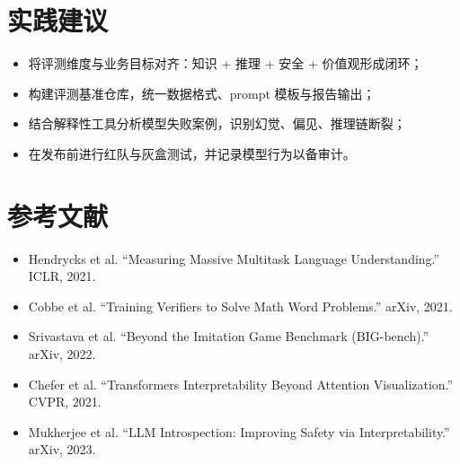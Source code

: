 \documentclass[UTF8,zihao=-4]{ctexart}
\begin{document}
\section*{实践建议}
\begin{itemize}
  \item 将评测维度与业务目标对齐：知识 + 推理 + 安全 + 价值观形成闭环；
  \item 构建评测基准仓库，统一数据格式、prompt 模板与报告输出；
  \item 结合解释性工具分析模型失败案例，识别幻觉、偏见、推理链断裂；
  \item 在发布前进行红队与灰盒测试，并记录模型行为以备审计。
\end{itemize}

\section*{参考文献}
\begin{itemize}
  \item Hendrycks et al. ``Measuring Massive Multitask Language Understanding.'' ICLR, 2021.
  \item Cobbe et al. ``Training Verifiers to Solve Math Word Problems.'' arXiv, 2021.
  \item Srivastava et al. ``Beyond the Imitation Game Benchmark (BIG-bench).'' arXiv, 2022.
  \item Chefer et al. ``Transformers Interpretability Beyond Attention Visualization.'' CVPR, 2021.
  \item Mukherjee et al. ``LLM Introspection: Improving Safety via Interpretability.'' arXiv, 2023.
\end{itemize}
\end{document}
